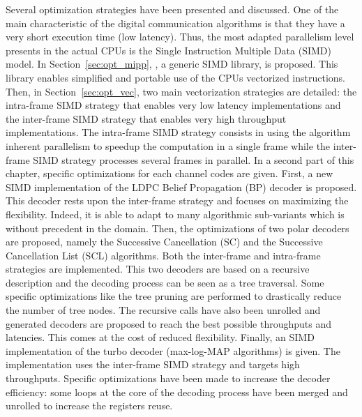 Several optimization strategies have been presented and discussed. One of the
main characteristic of the digital communication algorithms is that they have a
very short execution time (low latency). Thus, the most adapted parallelism
level presents in the actual CPUs is the Single Instruction Multiple Data (SIMD)
model. In Section~\ref{sec:opt_mipp}, \MIPP, a generic SIMD library, is
proposed. This library enables simplified and portable use of the CPUs
vectorized instructions. Then, in Section~\ref{sec:opt_vec}, two main
vectorization strategies are detailed: the intra-frame SIMD strategy that
enables very low latency implementations and the inter-frame SIMD strategy that
enables very high throughput implementations. The intra-frame SIMD strategy
consists in using the algorithm inherent parallelism to speedup the computation
in a single frame while the inter-frame SIMD strategy processes several frames
in parallel. In a second part of this chapter, specific optimizations for each
channel codes are given. First, a new SIMD implementation of the LDPC Belief
Propagation (BP) decoder is proposed. This decoder rests upon the inter-frame
strategy and focuses on maximizing the flexibility. Indeed, it is able to adapt
to many algorithmic sub-variants which is without precedent in the domain. Then,
the optimizations of two polar decoders are proposed, namely the Successive
Cancellation (SC) and the Successive Cancellation List (SCL) algorithms. Both
the inter-frame and intra-frame strategies are implemented. This two decoders
are based on a recursive description and the decoding process can be seen as a
tree traversal. Some specific optimizations like the tree pruning are performed
to drastically reduce the number of tree nodes. The recursive calls have also
been unrolled and generated decoders are proposed to reach the best possible
throughputs and latencies. This comes at the cost of reduced flexibility.
Finally, an SIMD implementation of the turbo decoder (max-log-MAP algorithms) is
given. The implementation uses the inter-frame SIMD strategy and targets high
throughputs. Specific optimizations have been made to increase the decoder
efficiency: some loops at the core of the decoding process have been merged and
unrolled to increase the registers reuse.

